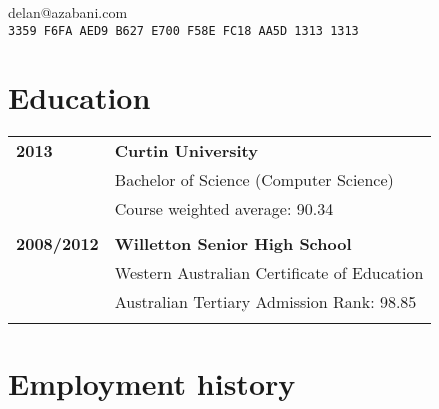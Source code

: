 \documentclass[a4paper,12pt]{article}
\begin{document}
\hrulefill

\hspace{1cm}\begin{minipage}{11cm}
	{\Huge delan\textcolor{lg}@azabani\textcolor{lg}{.com}}
	\vspace{0.5em}\\\textcolor{lg}{
	\texttt{3359 F6FA AED9 B627 E700 F58E FC18 AA5D 1313 1313}}
\end{minipage}\hfill\begin{minipage}{4cm}
\end{minipage}\hspace{1cm}

\hrulefill

\section*{Education}

\begin{tabular}{p{3.5cm}p{12.5cm}}
	\textbf{2013} &
		\textbf{Curtin University}\\
		& Bachelor of Science (Computer Science)\\
		& Course weighted average: 90.34\\\\
	\textbf{2008/2012} &
		\textbf{Willetton Senior High School}\\
		& Western Australian Certificate of Education\\
		& Australian Tertiary Admission Rank: 98.85\\\\
\end{tabular}

\section*{Employment history}
\end{document}
